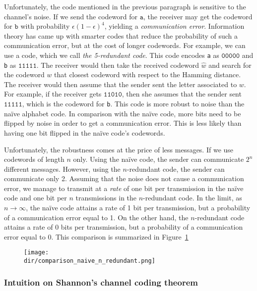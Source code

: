 Unfortunately, the code mentioned in the previous paragraph is sensitive to the channel's noise. If we send the codeword for $\texttt{a}$, the receiver may get the codeword for $\texttt{b}$ with probability $\epsilon\left(1 - \epsilon\right)^4$, yielding a \emph{communication error}. Information theory has came up with smarter codes that reduce the probability of such a communication error, but at the cost of longer codewords. For example, we can use a code, which we call \emph{the 5-redundant code}. This code encodes \texttt{a} as $\texttt{00000}$ and \texttt{b} as $\texttt{11111}$. The receiver would then take the received codeword $\hat{w}$ and search for the codeword $w$ that closest codeword with respect to the Hamming distance. The receiver would then assume that the sender sent the letter associated to $w$. For example, if the receiver gets $\texttt{11010}$, then she assumes that the sender sent $\texttt{11111}$, which is the codeword for \texttt{b}. This code is more robust to noise than the na\"ive alphabet code. In comparison with the na\"ive code, more bits need to be flipped by noise in order to get a communication error. This is less likely than having one bit flipped in the na\"ive code's codewords.

Unfortunately, the robustness comes at the price of less messages. If we use codewords of length $n$ only. Using the na\"ive code, the sender can communicate $2^n$ different messages. However, using the $n$-redundant code, the sender can communicate only 2. Assuming that the noise does not cause a communication error, we manage to transmit at a \emph{rate} of one bit per transmission in the na\"ive code and one bit per $n$ transmissions in the $n$-redundant code. In the limit, as $n \to \infty$, the na\"ive code attains a rate of 1 bit per transmission, but a probability of a communication error equal to 1. On the other hand, the $n$-redundant code attains a rate of 0 bits per transmission, but a probability of a communication error equal to 0. This comparison is summarized in Figure~\ref{fig:comparison_naive_n_redundant}

\begin{figure}
\texttt{[image: \\dir/comparison\_naive\_n\_redundant.png]}
\caption{}
\label{fig:comparison_naive_n_redundant}
\end{figure}

\subsubsection*{Intuition on Shannon's channel coding theorem}

